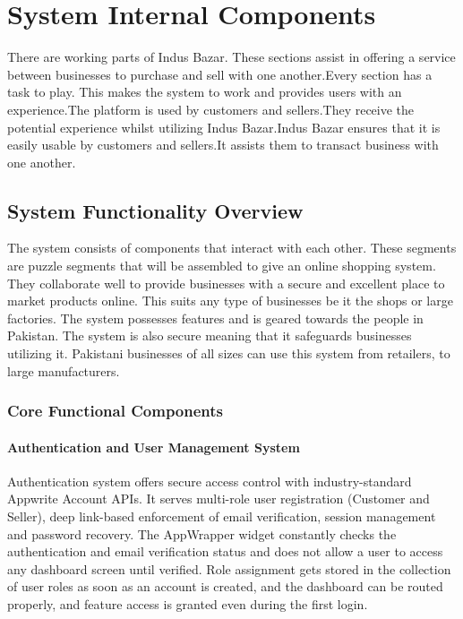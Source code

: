 \section{System Internal Components}
There are working parts of Indus Bazar. These sections assist in offering a service between businesses to purchase and sell with one another.Every section has a task to play. This makes the system to work and provides users with an experience.The platform is used by customers and sellers.They receive the potential experience whilst utilizing Indus Bazar.Indus Bazar ensures that it is easily usable by customers and sellers.It assists them to transact business with one another.
\subsection{System Functionality Overview}
The system consists of components that interact with each other. These segments are puzzle segments that will be assembled to give an online shopping system. They collaborate well to provide businesses with a secure and excellent place to market products online. This suits any type of businesses be it the shops or large factories. The system possesses features and is geared towards the people in Pakistan. The system is also secure meaning that it safeguards businesses utilizing it. Pakistani businesses of all sizes can use this system from retailers, to large manufacturers.

\subsubsection{Core Functional Components}

\paragraph{Authentication and User Management System}
Authentication system offers secure access control with industry-standard Appwrite Account APIs. It serves multi-role user registration (Customer and Seller), deep link-based enforcement of email verification, session management and password recovery. The AppWrapper widget constantly checks the authentication and email verification status and does not allow a user to access any dashboard screen until verified. Role assignment gets stored in the collection of user roles as soon as an account is created, and the dashboard can be routed properly, and feature access is granted even during the first login.

